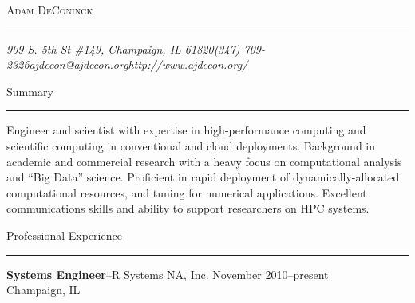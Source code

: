 \documentclass[10pt]{article}
\makeatletter
\newcommand{\name}{Adam DeConinck}
\newcommand{\addr}{909 S. 5th St \#149, Champaign, IL 61820}
\newcommand{\phone}{(347) 709-2326}
\newcommand{\email}{ajdecon@ajdecon.org}
\newcommand{\website}{http://www.ajdecon.org/}
\newcommand{\linkedin}{http://www.linkedin.com/in/ajdecon}
\newcommand{\bigname}[1]{
	\begin{center}\fontfamily{phv}\selectfont\Huge\scshape#1\end{center}
}
\newcommand{\bigsection}[1]{	
	\vspace{4pt}
	{\fontfamily{phv}\selectfont\Large#1}

	\vspace{-10pt} \rule{\textwidth}{1pt}
}
\newcommand{\jobitem}[4]{
    \vspace{2pt}

    \textbf{#1}--#2 \hfill #3\\ #4

    \vspace{-8pt}
}
\makeatother
\begin{document}
 \selectfont

\bigname{\name}

\vspace{-8pt} \rule{\textwidth}{1pt}

\vspace{-1pt} {\small\itshape \addr \hfill \phone \hfill \email \hfill \website} %

\vspace{6pt}
\bigsection{Summary}
Engineer and scientist with expertise in high-performance computing and scientific computing in conventional and cloud deployments. 
Background in academic and commercial research with a heavy focus on computational analysis and ``Big Data'' science. Proficient
in rapid deployment of dynamically-allocated computational resources, and tuning for numerical applications.  Excellent communications skills and ability to support 
researchers on HPC systems.

\vspace{4pt}
\bigsection{Professional Experience}

\vspace{-10pt}

\jobitem{Systems Engineer}{R Systems NA, Inc.}{November 2010--present}{Champaign, IL}
\end{document}
